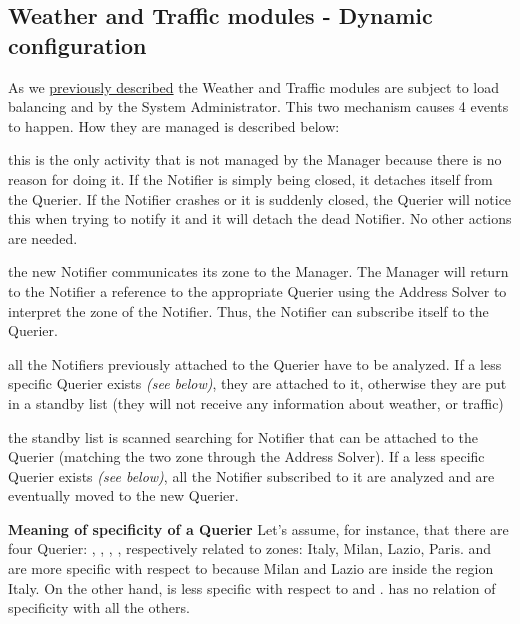 \subsection{Weather and Traffic modules - Dynamic configuration}
	\label{sect:WeatherTrafficAlgorithm}
	As we \hyperref[sect:WeatherTrafficModules]{previously described} the Weather and Traffic modules are subject to load balancing and  by the System Administrator. This two mechanism causes 4 events to happen. How they are managed is described below:
	\begin{description}[before={\renewcommand{\makelabel}[1]{-- \textit{##1}:}}]
		\item[a Notifier is deleted] this is the only activity that is not managed by the Manager because there is no reason for doing it. If the Notifier is simply being closed, it detaches itself from the Querier. If the Notifier crashes or it is suddenly closed, the Querier will notice this when trying to notify it and it will detach the dead Notifier. No other actions are needed.
		\item[a Notifier is created] the new Notifier communicates its zone to the Manager. The Manager will return to the Notifier a reference to the appropriate Querier using the Address Solver to interpret the zone of the Notifier. Thus, the Notifier can subscribe itself to the Querier.
		\item[a new Quierier is deleted] all the Notifiers previously attached to the Querier have to be analyzed. If a less specific Querier exists \textit{(see below)}, they are attached to it, otherwise they are put in a standby list (they will not receive any information about weather, or traffic)
		\item[a new Querier is instantiated] the standby list is scanned searching for Notifier that can be attached to the Querier (matching the two zone through the Address Solver). If a less specific Querier exists \textit{(see below)}, all the Notifier subscribed to it are analyzed and are eventually moved to the new Querier.
	\end{description}
	\medskip
	\textbf{Meaning of specificity of a Querier}\newline
	Let's assume, for instance, that there are four Querier: , , , , respectively related to zones: Italy, Milan, Lazio, Paris.  and  are more specific with respect to  because Milan and Lazio are inside the region Italy. On the other hand,  is less specific with respect to  and .  has no relation of specificity with all the others.\newline
